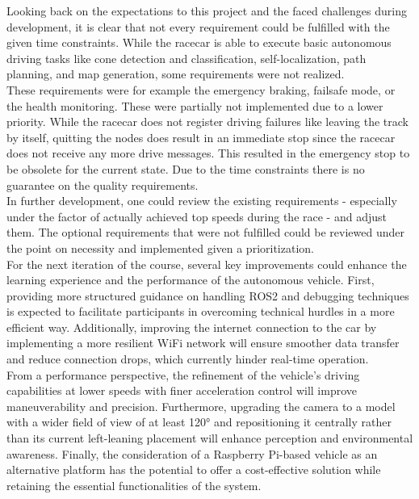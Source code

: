 Looking back on the expectations to this project and the faced challenges during development, it is clear that not every requirement could be fulfilled with the given time constraints. While the racecar is able to execute basic autonomous driving tasks like cone detection and classification, self-localization, path planning, and map generation, some requirements were not realized.\\
\newline
These requirements were for example the emergency braking, failsafe mode, or the health monitoring. These were partially not implemented due to a lower priority. While the racecar does not register driving failures like leaving the track by itself, quitting the nodes does result in an immediate stop since the racecar does not receive any more drive messages. This resulted in the emergency stop to be obsolete for the current state. Due to the time constraints there is no guarantee on the quality requirements. \\
\newline
In further development, one could review the existing requirements - especially under the factor of actually achieved top speeds during the race - and adjust them. The optional requirements that were not fulfilled could be reviewed under the point on necessity and implemented given a prioritization. \\
\newline
For the next iteration of the course, several key improvements could enhance the learning experience and the performance of the autonomous vehicle. First, providing more structured guidance on handling ROS2 and debugging techniques is expected to facilitate participants in overcoming technical hurdles in a more efficient way.
Additionally, improving the internet connection to the car by implementing a more resilient WiFi network will ensure smoother data transfer and reduce connection drops, which currently hinder real-time operation.\\ 
\newline
From a performance perspective, the refinement of the vehicle's driving capabilities at lower speeds with finer acceleration control will improve maneuverability and precision. 
Furthermore, upgrading the camera to a model with a wider field of view of at least 120° and repositioning it centrally rather than its current left-leaning placement will enhance perception and environmental awareness. 
Finally, the consideration of a Raspberry Pi-based vehicle as an alternative platform has the potential to offer a cost-effective solution while retaining the essential functionalities of the system.
